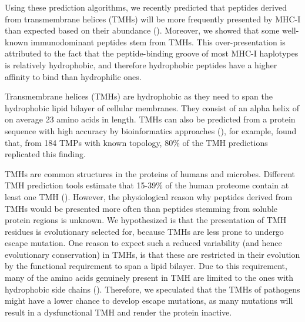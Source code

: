 
Using these prediction algorithms, 
we recently predicted that peptides derived 
from transmembrane helices (TMHs) 
will be more frequently presented by MHC-I 
than expected based on their abundance (\cite{bianchi2017}). 
Moreover, we showed that some well-known immunodominant peptides stem from TMHs. This over-presentation is attributed to the fact 
that the peptide-binding groove of most MHC-I haplotypes 
is relatively hydrophobic, 
and therefore hydrophobic peptides have a higher affinity to bind
than hydrophilic ones. 

Transmembrane helices (TMHs) are hydrophobic 
as they need to span the hydrophobic lipid bilayer of cellular membranes.
They consist of an alpha helix of on average 23 amino acids in length. TMHs can also be predicted from a protein sequence 
with high accuracy by bioinformatics approaches (\cite{krogh2001predicting,bianchi2017,kall2004combined,arai2004conpred,jones2007improving,klammer2009metatm,wang2019efficient}),
for example, \cite{jones2007improving} found that,
from 184 TMPs with known topology, 
80\% of the TMH predictions replicated this finding.
 
TMHs are common structures in the proteins of humans and microbes. 
Different TMH prediction tools estimate
that 15-39\% of the human proteome 
contain at least one TMH (\cite{ahram2006estimation}).
However, the physiological reason why peptides derived from TMHs 
would be presented more often than peptides 
stemming from soluble protein regions is unknown. 
We hypothesized is that the presentation of 
TMH residues is evolutionary selected for, 
because TMHs are less prone to undergo escape mutation. 
One reason to expect such a reduced 
variability (and hence evolutionary conservation) in TMHs, 
is that these are restricted in their evolution 
by the functional requirement to span a lipid bilayer. 
Due to this requirement, 
many of the amino acids genuinely present in TMH 
are limited to the ones with hydrophobic side chains (\cite{jones1994model}).
Therefore, we speculated that the TMHs of pathogens 
might have a lower chance to develop escape mutations, 
as many mutations will result in a dysfunctional TMH 
and render the protein inactive.

